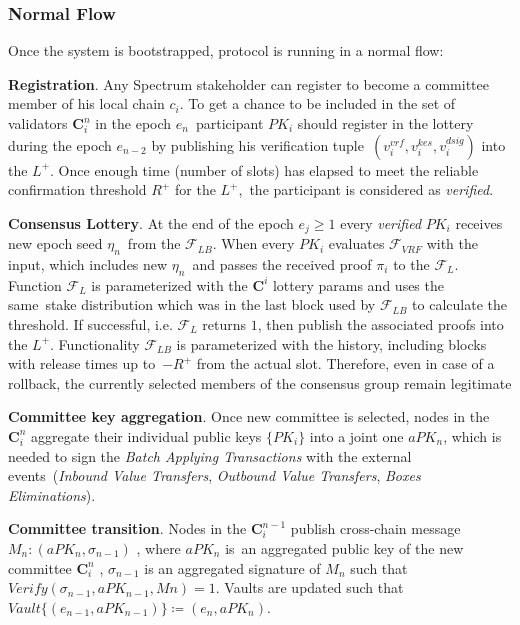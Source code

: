 \subsubsection{Normal Flow}\label{subsubsec:normal-flow}
Once the system is bootstrapped, protocol is running in a normal flow:
\begin{legal}
    \item \textbf{Registration}.
    Any Spectrum stakeholder can register to become a committee member of his local chain $c_i$.
    To get a chance to be included in the set of validators $\mathbf{C}^n_i$ in the epoch $e_n$\
    participant $PK_i$ should register in the lottery during the epoch $e_{n-2}$ by publishing his verification tuple\
    ${(v_i^{vrf}, v_i^{kes}, v_i^{dsig})}$ into the $L^+$.
    Once enough time (number of slots) has elapsed to meet the reliable confirmation threshold $R^+$ for the $L^+$,\
    the participant is considered as \textit{verified}.

    \item \textbf{Consensus Lottery}.
    At the end of the epoch ${e_j \geq 1}$ every \textit{verified} $PK_i$ receives new epoch seed $\eta_n$\
    from the ${\mathcal{F}}_{LB}$.
    When every $PK_i$ evaluates ${\mathcal{F}}_{VRF}$ with the input, which includes new $\eta_n$\
    and passes the received proof $\pi_i$ to the ${\mathcal{F}}_{L}$.
    Function ${\mathcal{F}}_{L}$ is parameterized with the $\mathbf{C}^i$ lottery params and uses the same\
    stake distribution which was in the last block used by ${\mathcal{F}}_{LB}$ to calculate the threshold.
    If successful, i.e. ${\mathcal{F}}_{L}$ returns $1$, then publish the associated proofs into the $L^+$.
    Functionality ${\mathcal{F}}_{LB}$ is parameterized with the history, including blocks with release times up to\
    ${-R^+}$ from the actual slot.
    Therefore, even in case of a rollback, the currently selected members of the consensus group remain legitimate

    \item \textbf{Committee key aggregation}.
    Once new committee is selected, nodes in the $\mathbf{C}_i^n$ aggregate their individual public keys $\{PK_i\}$ into
    a joint one $aPK_n$, which is needed to sign the \textit{Batch Applying Transactions} with the external events\
    (\textit{Inbound Value Transfers}, \textit{Outbound Value Transfers}, \textit{Boxes Eliminations}).

    \item \textbf{Committee transition}.
    Nodes in the $\mathbf{C}_i^{n-1}$ publish cross-chain message ${M_n : (aPK_n, \sigma_{n-1})}$ , where $aPK_n$ is\
    an aggregated public key of the new committee $\mathbf{C}_i^n$ , $\sigma_{n-1}$ is an aggregated signature of
    $M_n$ such that ${Verify(\sigma_{n-1}, aPK_{n-1}, Mn) = 1}$.
    Vaults are updated such that ${Vault\{(e_{n-1}, aPK_{n-1})\} \coloneqq(e_n, aPK_n)}$.


\end{legal}
